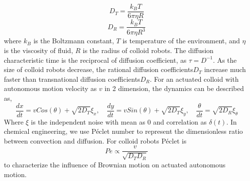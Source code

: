 \begin{equation}
    D_T=\frac{k_B T}{6 \pi \eta R }
\end{equation}
\begin{equation}
    D_R=\frac{k_B T}{6 \pi \eta R^3 }
\end{equation}
where $k_B$ is the Boltzmann constant, $T$ is temperature of the environment, and $\eta$ is the viscosity of fluid, $R$ is the radius of colloid robots. The diffusion characteristic time is the 
reciprocal of diffusion coefficient, as  $\tau=D^{-1}$. As the size of colloid robots decrease, the rational diffusion coefficients$D_T$ increase much faster than transnational diffusion coefficients$D_R$. For an actuated colloid with autonomous motion velocity as $v$ in 2 dimension, the dynamics can be described as,
\begin{equation}
    \frac{dx}{dt}=v Cos(\theta)+\sqrt{2 D_T}\xi_x, \quad \frac{dy}{dt}=v Sin(\theta)+\sqrt{2 D_T}\xi_y,\quad
    \frac{\theta}{dt}=\sqrt{2 D_R}\xi_\theta
\end{equation}
Where $\xi$ is the independent noise with mean as $0$ and correlation as $\delta(t)$. In chemical engineering, we use Péclet number to represent the dimensionless ratio between convection  and diffusion. For colloid robots  Péclet is 
\begin{equation}
    Pe\propto\frac{v}{\sqrt{D_T D_R}}
\end{equation}
to characterize the influence of Brownian motion on  actuated autonomous motion.

